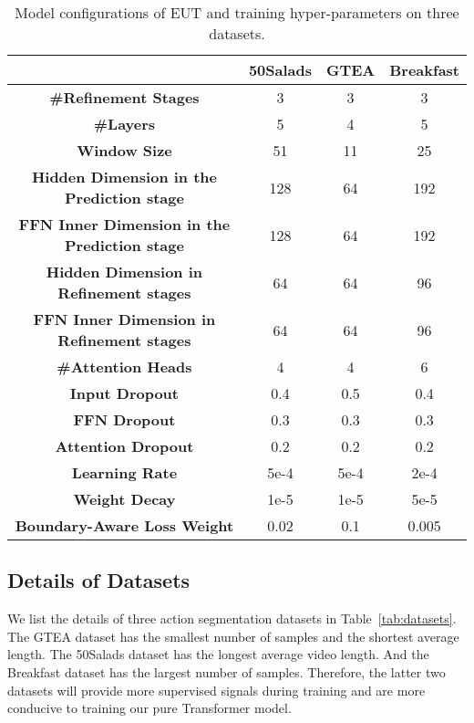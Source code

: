 \documentclass[letterpaper]{article} \usepackage[submission]{aaai23}  \usepackage{times}  \usepackage{helvet}  \usepackage{courier}  \usepackage[hyphens]{url}  \usepackage{graphicx} \urlstyle{rm} \def\UrlFont{\rm}  \usepackage{natbib}  \usepackage{caption} \frenchspacing  \setlength{\pdfpagewidth}{8.5in} \setlength{\pdfpageheight}{11in} \usepackage{algorithm}
\begin{document}
\begin{table*}[t]
\centering
\begin{tabular}{cccc}
    \toprule
    & 50Salads & GTEA  & Breakfast \\
    \midrule
    \textbf{\#Refinement Stages}                 & 3 & 3 & 3 \\
    \textbf{\#Layers}                 & 5 &  4 & 5 \\
    \textbf{Window Size}                 & 51 & 11 & 25 \\
    \textbf{Hidden Dimension in the Prediction stage}   & 128 & 64 &  192\\
    \textbf{FFN Inner Dimension in the Prediction stage}     & 128 & 64 &  192\\
    \textbf{Hidden Dimension in Refinement stages}   & 64 &  64 & 96\\
    \textbf{FFN Inner Dimension in Refinement stages} & 64 &  64 & 96\\
    \textbf{\#Attention Heads}            & 4 &  4 & 6\\
    \textbf{Input Dropout}  & 0.4 & 0.5  & 0.4\\
    \textbf{FFN Dropout}    & 0.3 & 0.3 &  0.3\\
    \textbf{Attention Dropout}    & 0.2 &  0.2 &  0.2\\
    \textbf{Learning Rate}   & 5e-4 & 5e-4 &  2e-4\\
    \textbf{Weight Decay}   & 1e-5 & 1e-5 &  5e-5\\
    \textbf{Boundary-Aware Loss Weight }   & 0.02 & 0.1 &  0.005\\
    \bottomrule
\end{tabular}
\caption{Model configurations of EUT and training hyper-parameters on three datasets.}
\label{tab:hyperparameters}
\end{table*}

\subsection{Details of Datasets}
\label{sec:dataset}
We list the details of three action segmentation datasets in Table~\ref{tab:datasets}. The GTEA dataset has the smallest number of samples and the shortest average length. The 50Salads dataset has the longest average video length. And the Breakfast dataset has the largest number of samples. Therefore, the latter two datasets will provide more supervised signals during training and are more conducive to training our pure Transformer model.
\end{document}
